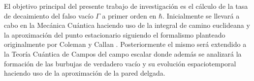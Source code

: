 El objetivo principal del presente trabajo de investigación es el cálculo de la tasa de decaimiento del falso vacío $\Gamma$ a primer orden en $\hbar$. 
Inicialmente se llevará a cabo en la Mecánica Cuántica haciendo uso de la integral de camino euclideana y la aproximación del punto estacionario siguiendo el formalismo planteado originalmente por Coleman y Callan \cite{coleman1977fate, callan1977fate}. %
Posteriormente el mismo será extendido a la Teoría Cuántica de Campos del campo escalar donde además se analizará  la formación de las burbujas de verdadero vacío y su evolución espaciotemporal haciendo uso de la aproximación de la pared delgada. 




%	
%	
%	
%	
%	







